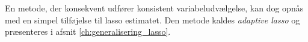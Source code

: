 %
%
%
En metode, der konsekvent udfører konsistent variabeludvælgelse, kan dog opnås med en simpel tilføjelse til lasso estimatet. Den metode kaldes \textit{adaptive lasso} og præsenteres i afsnit \ref{ch:generalisering_lasso}.

